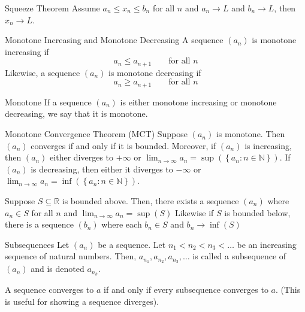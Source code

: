 \documentclass[12pt]{article}
\begin{document}
\begin{theorem}{Squeeze Theorem}{}
    Assume $ a_n \leq x_n \leq b_n $ for all $ n $ and $ a_n \to L $ and $ b_n \to L $, then $ x_n \to L $.
\end{theorem}
\begin{definition}{Monotone Increasing and Monotone Decreasing}{}
    A sequence $ \left( a_n \right) $ is monotone increasing if
    \[ a_n \leq a_{n + 1} \qquad \text{for all } n \]
    Likewise, a sequence $ \left( a_n \right) $ is monotone decreasing if
    \[ a_n \geq a_{n + 1}  \qquad \text{for all } n \]
\end{definition}
\begin{definition}{Monotone}{}
    If a sequence $ \left( a_n \right) $ is either monotone increasing or monotone decreasing, we say that it is monotone.
\end{definition}
\begin{theorem}{Monotone Convergence Theorem (MCT)}{}
    Suppose $ \left( a_n \right) $ is monotone. Then $ \left( a_n \right) $ converges if and only if it is bounded. Moreover, if $ \left( a_n \right) $ is increasing, then $ \left( a_n \right) $ either diverges to $ + \infty $ or $ \lim_{n \to \infty} a_n = \sup \left( \left\{ a_n : n \in \mathbb{N} \right\} \right) $. If $ \left( a_n \right) $ is decreasing, then either it diverges to $ - \infty $ or $ \lim_{n \to \infty} a_n = \inf \left( \left\{ a_n : n \in \mathbb{N} \right\} \right) $.
\end{theorem}
\begin{proposition}{}{}
    Suppose $ S \subseteq \mathbb{R} $ is bounded above. Then, there exists a sequence $ \left( a_n \right) $ where $ a_n \in S $ for all $ n $ and $ \lim_{n \to \infty} a_n = \sup \left( S \right) $
    \medskip
    \newline
    Likewise if $ S $ is bounded below, there is a sequence $ \left( b_n \right) $ where each $ b_n \in S $ and $ b_n \to \inf \left( S \right) $
\end{proposition}
\begin{definition}{Subsequences}{}
    Let $ \left( a_n \right) $ be a sequence. Let $ n_1 < n_2 < n_3 < \dots $ be an increasing sequence of natural numbers. Then, $ a_{n_1}, a_{n_2}, a_{n_3}, \dots $ is called a subsequence of $ \left( a_n \right) $ and is denoted $ a_{n_k} $.
\end{definition}
\begin{proposition}{}{}
    A sequence converges to $ a $ if and only if every subsequence converges to $ a $. (This is useful for showing a sequence diverges).
\end{proposition}
\end{document}
